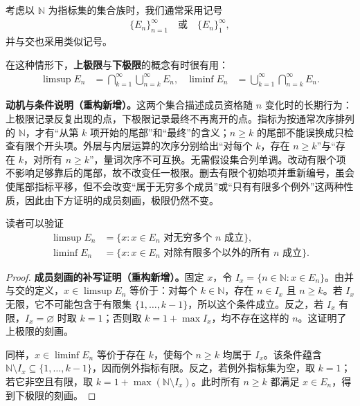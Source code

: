 \documentclass[../../main.tex]{subfiles}%
\begin{document}
考虑以 $\mathbb{N}$ 为指标集的集合族时，我们通常采用记号
\begin{align*}
\{E_n\}_{n=1}^{\infty}\quad\text{或}\quad\{E_n\}_1^{\infty},
\end{align*}
并与交也采用类似记号。
\begin{definition}[集合序列的上极限与下极限]\label{definition:ch00-set-sequences}
在这种情形下，\textbf{上极限}与\textbf{下极限}的概念有时很有用：
\begin{align*}
\limsup E_n&=\bigcap_{k=1}^{\infty}\bigcup_{n=k}^{\infty}E_n,
&\liminf E_n&=\bigcup_{k=1}^{\infty}\bigcap_{n=k}^{\infty}E_n.
\end{align*}
\end{definition}
\begin{remark}
\textbf{动机与条件说明（重构新增）。}这两个集合描述成员资格随 $n$ 变化时的长期行为：上极限记录反复出现的点，下极限记录最终不再离开的点。指标为按通常次序排列的 $\mathbb{N}$，才有“从第 $k$ 项开始的尾部”和“最终”的含义；$n\geqslant k$ 的尾部不能误换成只检查有限个开头项。外层与内层运算的次序分别给出“对每个 $k$，存在 $n\geqslant k$”与“存在 $k$，对所有 $n\geqslant k$”，量词次序不可互换。无需假设集合列单调。改动有限个项不影响足够靠后的尾部，故不改变任一极限。删去有限个初始项并重新编号，虽会使尾部指标平移，但不会改变“属于无穷多个成员”或“只有有限多个例外”这两种性质，因此由下方证明的成员刻画，极限仍然不变。
\end{remark}



\begin{remark}
读者可以验证
\begin{align*}
\limsup E_n&=\{x:x\in E_n\text{ 对无穷多个 }n\text{ 成立}\},\\
\liminf E_n&=\{x:x\in E_n\text{ 对除有限多个以外的所有 }n\text{ 成立}\}.
\end{align*}
\end{remark}
\begin{proof}
\textbf{成员刻画的补写证明（重构新增）。}固定 $x$，令 $I_x=\{n\in\mathbb{N}:x\in E_n\}$。由并与交的定义，$x\in\limsup E_n$ 等价于：对每个 $k\in\mathbb{N}$，存在 $n\in I_x$ 且 $n\geqslant k$。若 $I_x$ 无限，它不可能包含于有限集 $\{1,\ldots,k-1\}$，所以这个条件成立。反之，若 $I_x$ 有限，$I_x=\varnothing$ 时取 $k=1$；否则取 $k=1+\max I_x$，均不存在这样的 $n$。这证明了上极限的刻画。

同样，$x\in\liminf E_n$ 等价于存在 $k$，使每个 $n\geqslant k$ 均属于 $I_x$。该条件蕴含 $\mathbb{N}\setminus I_x\subseteq\{1,\ldots,k-1\}$，因而例外指标有限。反之，若例外指标集为空，取 $k=1$；若它非空且有限，取 $k=1+\max(\mathbb{N}\setminus I_x)$。此时所有 $n\geqslant k$ 都满足 $x\in E_n$，得到下极限的刻画。
\end{proof}
\end{document}
